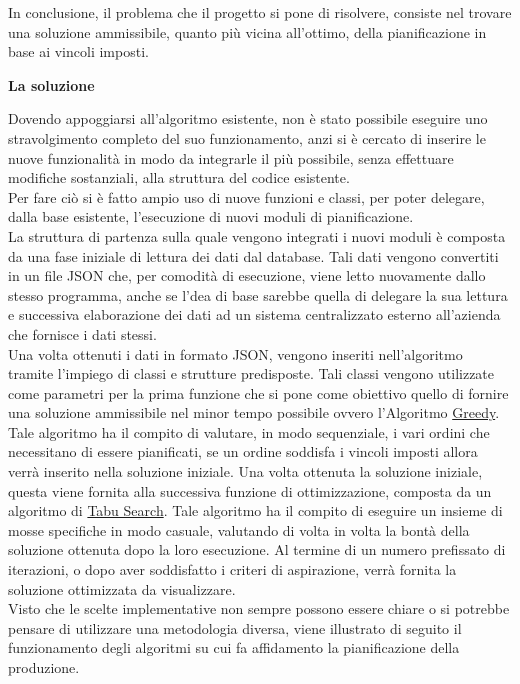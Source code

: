 In conclusione, il problema che il progetto si pone di risolvere, consiste nel trovare una soluzione ammissibile, quanto più vicina all'ottimo,
della pianificazione
in base ai vincoli imposti.\newline

\textbf{La soluzione}

Dovendo appoggiarsi all'algoritmo esistente, non è stato possibile eseguire uno stravolgimento completo del suo funzionamento, anzi si è cercato di inserire le nuove funzionalità
in modo da integrarle il più possibile, senza effettuare modifiche sostanziali, alla struttura del codice esistente.\\ Per fare ciò si è fatto ampio uso di nuove funzioni e classi, per poter
delegare, dalla base esistente, l'esecuzione di nuovi moduli di pianificazione.\\ La struttura di partenza sulla quale vengono integrati i nuovi moduli è composta da una fase iniziale
di lettura dei dati dal database. Tali dati vengono convertiti in un file JSON che, per comodità di esecuzione, viene letto nuovamente dallo stesso programma, anche se
l'dea di base sarebbe quella di delegare la sua lettura e successiva elaborazione dei dati ad un sistema centralizzato esterno all'azienda che fornisce i dati stessi.\\
Una volta ottenuti i dati in formato JSON, vengono inseriti nell'algoritmo tramite l'impiego di classi e strutture predisposte. Tali classi vengono utilizzate come parametri
per la prima funzione che si pone come obiettivo quello di fornire una soluzione ammissibile nel minor tempo possibile ovvero l'Algoritmo \hyperref[Greedy]{Greedy\glo}.\\ Tale algoritmo ha il compito
di valutare, in modo sequenziale, i vari ordini che necessitano di essere pianificati, se un ordine soddisfa i vincoli imposti allora verrà inserito nella soluzione iniziale.
Una volta ottenuta la soluzione iniziale, questa viene fornita alla successiva funzione di ottimizzazione, composta da un algoritmo di \hyperref[Tabu Search]{Tabu Search\glo}. Tale algoritmo ha il compito
di eseguire un insieme di mosse specifiche in modo casuale, valutando di volta in volta la bontà della soluzione ottenuta dopo la loro esecuzione. Al termine di un numero prefissato
di iterazioni, o dopo aver soddisfatto i criteri di aspirazione, verrà fornita la soluzione ottimizzata da visualizzare.\\
Visto che le scelte implementative non sempre possono essere chiare o si potrebbe pensare di utilizzare una metodologia diversa, viene illustrato di seguito il funzionamento
degli algoritmi su cui fa affidamento la pianificazione della produzione.\\

